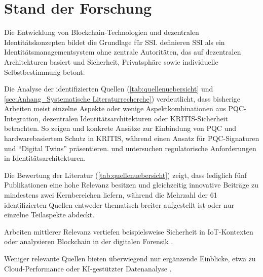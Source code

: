 \newpage
\section{Stand der Forschung} \label{sec:Stand der Forschung}

Die Entwicklung von Blockchain-Technologien und dezentralen Identitätskonzepten bildet die Grundlage für \ac{SSI}. \textcite[S. 2]{giannopoulou_SelfsovereignIdentity_2021} definieren \ac{SSI} als ein Identitätsmanagementsystem ohne zentrale Autoritäten, das auf dezentralen Architekturen basiert und Sicherheit, Privatsphäre sowie individuelle Selbstbestimmung betont.

Die Analyse der identifizierten Quellen (\autoref{tab:quellenuebersicht} und \ref{sec:Anhang_Systematische Literaturrecherche}) verdeutlicht, dass bisherige Arbeiten meist einzelne Aspekte oder wenige Aspektkombinationen aus \ac{PQC}-Integration, dezentralen Identitätsarchitekturen oder \ac{KRITIS}-Sicherheit betrachten. So zeigen \textcite{alam_PrivatelyGeneratedKeyPairsPostQuantumCryptographyDistributedNetwork_2024} und \textcite{szymanski_QuantumSafeSoftwareDefinedDeterministicInternetThingsIoTHardwareEnforcedCyberSecurityCriticalInfrastructures_2024} konkrete Ansätze zur Einbindung von \ac{PQC} und hardwarebasiertem Schutz in \ac{KRITIS}, während \textcite{nouma_TrustworthyEfficientDigitalTwinsPostQuantumEraHybridHardwareAssistedSignatures_2024} einen Ansatz für \ac{PQC}-Signaturen und \enquote{Digital Twins} präsentieren. \textcite{sharif_EIDASRegulationSurveyTechnologicalTrendsEuropeanElectronicIdentitySchemes_2022} und \textcite{radanliev_ReviewComparisonUSEUUKRegulationsCyberRiskSecurityCurrentBlockchainTechnologies_2023} untersuchen regulatorische Anforderungen in Identitätsarchitekturen. 

Die Bewertung der Literatur (\autoref{tab:quellenuebersicht}) zeigt, dass lediglich fünf Publikationen eine hohe Relevanz besitzen und gleichzeitig innovative Beiträge zu mindestens zwei Kernbereichen liefern, während die Mehrzahl der 61 identifizierten Quellen entweder thematisch breiter aufgestellt ist oder nur einzelne Teilaspekte abdeckt.

Arbeiten mittlerer Relevanz vertiefen beispielsweise Sicherheit in \ac{IoT}-Kontexten \parencite{enaya_SurveyBlockchainBasedApplicationsIoT_2025} oder analysieren Blockchain in der digitalen Forensik \parencite{atlam_BlockchainForensicsSystematicLiteratureReviewTechniquesApplicationsChallengesFutureDirections_2024}.

Weniger relevante Quellen bieten überwiegend nur ergänzende Einblicke, etwa zu Cloud-Performance \parencite{zboril_PerformanceComparisonCloudvirtualmachines_2025} oder KI-gestützter Datenanalyse \parencite{kumar_AIPoweredEvolutionBigData_2024}.

